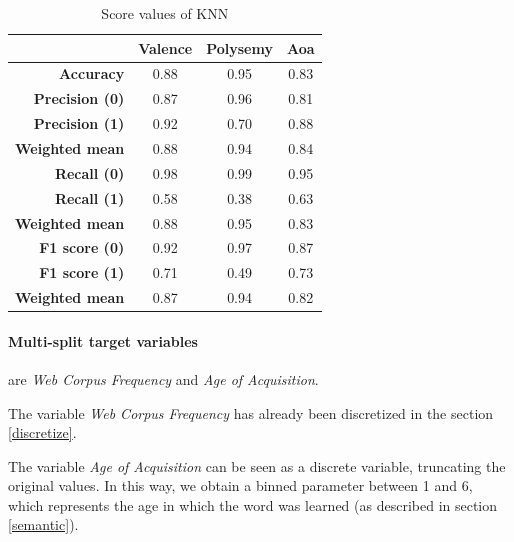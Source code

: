 \documentclass[a4paper,11pt,dvipsnames]{article}
\begin{document}
   \begin{minipage}{0.49\linewidth}
    \centering
        \begin{table}[H]

    \centering
    \begin{tabular}{|r|c|c|c|}
    \hline
        & Valence & Polysemy & Aoa\\\hline\hline
        
        \textbf{Accuracy} & 0.88 & 0.95 & 0.83\\\hline
        
        \textbf{Precision (0)} & 0.87 & 0.96 & 0.81\\
        \textbf{Precision (1)} & 0.92 & 0.70 & 0.88\\
        \textbf{Weighted mean} & 0.88 & 0.94 & 0.84\\\hline
        
        \textbf{Recall (0)} & 0.98 & 0.99 & 0.95\\
        \textbf{Recall (1)} & 0.58 & 0.38 & 0.63\\
        \textbf{Weighted mean} & 0.88 & 0.95 & 0.83\\\hline
        
        \textbf{F1 score (0)} & 0.92 & 0.97 & 0.87\\
        \textbf{F1 score (1)} & 0.71 & 0.49 & 0.73\\
        \textbf{Weighted mean} & 0.87 & 0.94 & 0.82\\\hline
        
    \end{tabular}
            \caption{Score values of KNN}    \label{tab:knn_scores}

    \end{table}
\end{minipage}


\paragraph{Multi-split target variables} are \textit{Web Corpus Frequency} and \textit{Age of Acquisition}. 

The variable \textit{Web Corpus Frequency} has already been discretized in the section \ref{discretize}.

The variable \textit{Age of Acquisition} can be seen as a discrete variable, truncating the original values. In this way, we obtain a binned parameter between 1 and 6, which represents the age in which the word was learned (as described in section \ref{semantic}).
\end{document}
